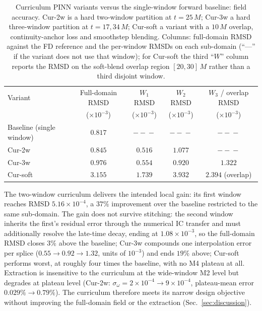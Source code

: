 \begin{table}[!htbp]
\centering
\caption{Curriculum PINN variants versus the single-window
forward baseline: field accuracy. Cur-2w is a hard two-window
partition at $t = 25\,M$; Cur-3w a hard three-window partition
at $t = 17, 34\,M$; Cur-soft a variant with a $10\,M$ overlap,
continuity-anchor loss and smoothstep blending. Columns:
full-domain RMSD against the FD reference and the per-window
RMSDs on each sub-domain (``---'' if the variant does not use
that window); for Cur-soft the third ``$W$'' column reports the
RMSD on the soft-blend overlap region $[20,30]\,M$ rather than
a third disjoint window.}
\label{tab:cur-summary}
\footnotesize
\setlength{\tabcolsep}{4pt}
\renewcommand{\arraystretch}{1.05}
\begin{tabular}{@{}lcccc@{}}
\toprule
Variant & Full-domain RMSD & $W_{1}$ RMSD & $W_{2}$ RMSD & $W_{3}$ / overlap RMSD \\
        & ($\times 10^{-3}$) & ($\times 10^{-3}$) & ($\times 10^{-3}$) & ($\times 10^{-3}$) \\
\midrule
Baseline (single window) & $\mathbf{0.817}$ & $-\!\!-\!\!-$ & $-\!\!-\!\!-$ & $-\!\!-\!\!-$ \\
\midrule
Cur-2w   & $0.845$ & $\mathbf{0.516}$ & $1.077$ & $-\!\!-\!\!-$ \\
Cur-3w   & $0.976$ & $0.554$          & $0.920$ & $1.322$ \\
Cur-soft & $3.155$ & $1.739$          & $3.932$ & $2.394$ (overlap) \\
\bottomrule
\end{tabular}
\end{table}

The two-window curriculum delivers the intended local gain: its
first window reaches RMSD $5.16\times 10^{-4}$, a $37\%$
improvement over the baseline restricted to the same
sub-domain. The gain does not survive stitching: the second
window inherits the first's residual error through the
numerical IC transfer and must additionally resolve the
late-time decay, ending at $1.08\times 10^{-3}$, so the
full-domain RMSD closes $3\%$ above the baseline; Cur-3w
compounds one interpolation error per splice
($0.55 \to 0.92 \to 1.32$, units of $10^{-3}$) and ends $19\%$
above; Cur-soft performs worst, at roughly four times the
baseline, with no M4 plateau at all. Extraction is insensitive
to the curriculum at the wide-window M2 level but degrades at
plateau level (Cur-2w: $\sigma_\omega = 2\times 10^{-4} \to
9\times 10^{-4}$, plateau-mean error $0.029\% \to 0.79\%$). The
curriculum therefore meets its narrow design objective without
improving the full-domain field or the extraction
(Sec.~\ref{sec:discussion}).
